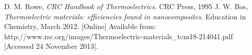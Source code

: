 \documentclass[a4paper,10pt,journal]{IEEEtran}
\begin{document}

\begin{thebibliography}{9}
D. M. Rowe, \emph{CRC Handbook of Thermoelectrics}. CRC Press, 1995
J. W. Bos, \emph{Thermoelectric materials: efficiencies found in
nanocomposites}. Education in Chemistry, March 2012. [Online] Available
from:
http://www.rsc.org/images/Thermoelectric-materials_tcm18-214041.pdf
[Accessed 24 November 2013].

\end{thebibliography}
\end{document}

